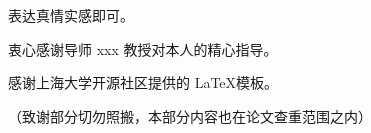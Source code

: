 \begin{acknowledgement}

    表达真情实感即可。

    衷心感谢导师 xxx 教授对本人的精心指导。
  
    感谢上海大学开源社区提供的 \LaTeX 模板。

    （致谢部分切勿照搬，本部分内容也在论文查重范围之内）


\end{acknowledgement}
